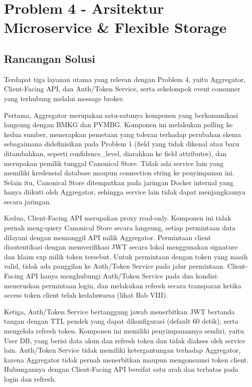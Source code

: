\chapter{Problem 4 - Arsitektur Microservice \& Flexible Storage}

\section{Rancangan Solusi}

Terdapat tiga layanan utama yang relevan dengan Problem 4, yaitu Aggregator, Client-Facing API, dan Auth/Token Service, serta sekelompok event consumer yang terhubung melalui message broker.

Pertama, Aggregator merupakan satu-satunya komponen yang berkomunikasi langsung dengan BMKG dan PVMBG. Komponen ini melakukan polling ke kedua sumber, menerapkan pemetaan yang toleran terhadap perubahan skema sebagaimana didefinisikan pada Problem 1 (field yang tidak dikenal atau baru ditambahkan, seperti confidence\_level, diarahkan ke field attributes), dan merupakan pemilik tunggal Canonical Store. Tidak ada service lain yang memiliki kredensial database maupun connection string ke penyimpanan ini. Selain itu, Canonical Store ditempatkan pada jaringan Docker internal yang hanya diikuti oleh Aggregator, sehingga service lain tidak dapat menjangkaunya secara jaringan.

Kedua, Client-Facing API merupakan proxy read-only. Komponen ini tidak pernah meng-query Canonical Store secara langsung, setiap permintaan data dilayani dengan memanggil API milik Aggregator. Permintaan client diautentikasi dengan memverifikasi JWT secara lokal menggunakan signature dan klaim exp milik token tersebut. Untuk permintaan dengan token yang masih valid, tidak ada panggilan ke Auth/Token Service pada jalur permintaan. Client-Facing API hanya menghubungi Auth/Token Service pada dua kondisi: meneruskan permintaan login, dan melakukan refresh secara transparan ketika access token client telah kedaluwarsa (lihat Bab VIII).

Ketiga, Auth/Token Service bertanggung jawab menerbitkan JWT bertanda tangan dengan TTL pendek yang dapat dikonfigurasi (default 60 detik), serta mengelola refresh token. Komponen ini memiliki penyimpanannya sendiri, yaitu User DB, yang berisi data akun dan refresh token dan tidak diakses oleh service lain. Auth/Token Service tidak memiliki ketergantungan terhadap Aggregator, karena Aggregator tidak pernah menerbitkan maupun mengonsumsi token client. Hubungannya dengan Client-Facing API bersifat satu arah dan terbatas pada login dan refresh.


